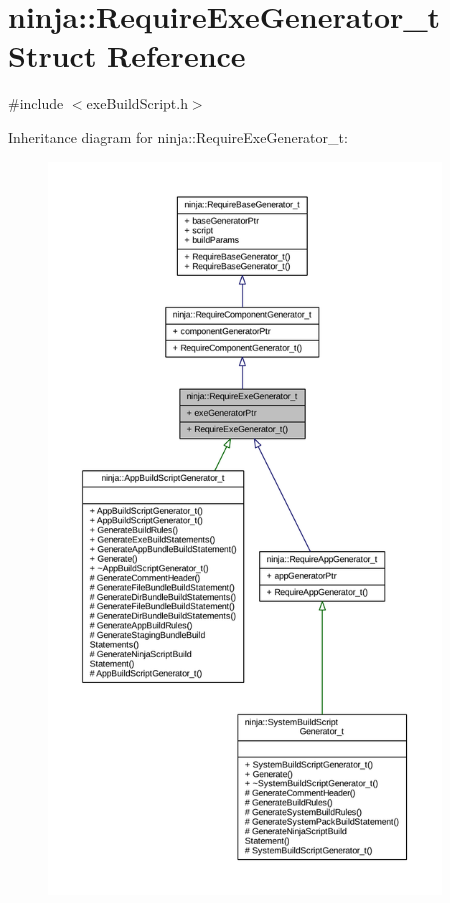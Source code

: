 \hypertarget{structninja_1_1_require_exe_generator__t}{}\section{ninja\+:\+:Require\+Exe\+Generator\+\_\+t Struct Reference}
\label{structninja_1_1_require_exe_generator__t}


{\ttfamily \#include $<$exe\+Build\+Script.\+h$>$}



Inheritance diagram for ninja\+:\+:Require\+Exe\+Generator\+\_\+t\+:
\nopagebreak
\begin{figure}[H]
\begin{center}
\leavevmode
\includegraphics[height=550pt]{structninja_1_1_require_exe_generator__t__inherit__graph}
\end{center}
\end{figure}


